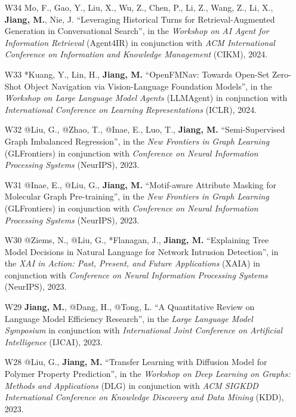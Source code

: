 \documentclass[10pt]{article}
\newenvironment{myindentpar}[1]%
{\begin{list}{}%
         {\setlength{\leftmargin}{#1}}%
         \item[]%
}
{\end{list}}
\newcounter{list}
\begin{document}
\begin{myindentpar}{0.00cm}
\begin{enumerate}[leftmargin=.5cm]
\item[W34] Mo, F., Gao, Y., Liu, X., Wu, Z., Chen, P., Li, Z., Wang, Z., Li, X., \textbf{Jiang, M.}, Nie, J. ``Leveraging Historical Turns for Retrieval-Augmented Generation in Conversational Search'', in the \textit{Workshop on AI Agent for Information Retrieval} (Agent4IR) in conjunction with \textit{ACM International Conference on Information and Knowledge Management} (CIKM), 2024.
		
\item[W33] *Kuang, Y., Lin, H., \textbf{Jiang, M.} ``OpenFMNav: Towards Open-Set Zero-Shot Object Navigation via Vision-Language Foundation Models'', in the \textit{Workshop on Large Language Model Agents} (LLMAgent) in conjunction with \textit{International Conference on Learning Representations} (ICLR), 2024.

\item[W32] @Liu, G., @Zhao, T., @Inae, E., Luo, T., \textbf{Jiang, M.} ``Semi-Supervised Graph Imbalanced Regression'', in the \textit{New Frontiers in Graph Learning} (GLFrontiers) in conjunction with \textit{Conference on Neural Information Processing Systems} (NeurIPS), 2023.

\item[W31] @Inae, E., @Liu, G., \textbf{Jiang, M.} ``Motif-aware Attribute Masking for Molecular Graph Pre-training'', in the \textit{New Frontiers in Graph Learning} (GLFrontiers) in conjunction with \textit{Conference on Neural Information Processing Systems} (NeurIPS), 2023.

\item[W30] @Ziems, N., @Liu, G., *Flanagan, J., \textbf{Jiang, M.} ``Explaining Tree Model Decisions in Natural Language for Network Intrusion Detection'', in the \textit{XAI in Action: Past, Present, and Future Applications} (XAIA) in conjunction with \textit{Conference on Neural Information Processing Systems} (NeurIPS), 2023.

\item[W29] \textbf{Jiang, M.}, @Dang, H., @Tong, L. ``A Quantitative Review on Language Model Efficiency Research'', in the \textit{Large Language Model Symposium} in conjunction with \textit{International Joint Conference on Artificial Intelligence} (IJCAI), 2023.

\item[W28] @Liu, G., \textbf{Jiang, M.} ``Transfer Learning with Diffusion Model for Polymer Property Prediction'', in the \textit{Workshop on Deep Learning on Graphs: Methods and Applications} (DLG) in conjunction with \textit{ACM SIGKDD International Conference on Knowledge Discovery and Data Mining} (KDD), 2023.


\end{enumerate}
\end{myindentpar}
\end{document}
